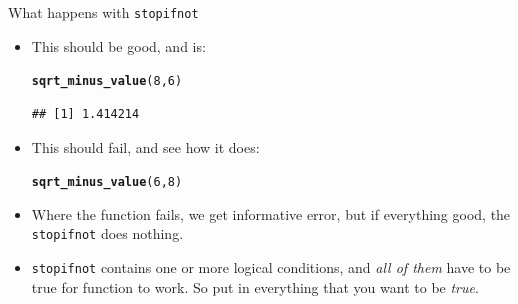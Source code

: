 \documentclass[unknownkeysallowed]{beamer}\usepackage[]{graphicx}\usepackage[]{color}
\makeatletter
\newcommand{\hlnum}[1]{\textcolor[rgb]{0.686,0.059,0.569}{#1}}%
\newcommand{\hlstd}[1]{\textcolor[rgb]{0.345,0.345,0.345}{#1}}%
\newcommand{\hlkwd}[1]{\textcolor[rgb]{0.737,0.353,0.396}{\textbf{#1}}}%
\newenvironment{kframe}{%
 \def\at@end@of@kframe{}%
 \ifinner\ifhmode%
  \def\at@end@of@kframe{\end{minipage}}%
  \begin{minipage}{\columnwidth}%
 \fi\fi%
 \def\FrameCommand##1{\hskip\@totalleftmargin \hskip-\fboxsep
 \colorbox{shadecolor}{##1}\hskip-\fboxsep
     \hskip-\linewidth \hskip-\@totalleftmargin \hskip\columnwidth}%
 \MakeFramed {\advance\hsize-\width
   \@totalleftmargin\z@ \linewidth\hsize
   \@setminipage}}%
 {\par\unskip\endMakeFramed%
 \at@end@of@kframe}
\newenvironment{knitrout}{}{} %
\makeatother
\begin{document}
\begin{frame}[fragile]{What happens with \texttt{stopifnot}}
  
  \begin{itemize}
  \item This should be good, and is:
    
\begin{knitrout}
\color{fgcolor}\begin{kframe}
\begin{alltt}
\hlkwd{sqrt_minus_value}\hlstd{(}\hlnum{8}\hlstd{,}\hlnum{6}\hlstd{)}
\end{alltt}
\begin{verbatim}
## [1] 1.414214
\end{verbatim}
\end{kframe}
\end{knitrout}

\item This should fail, and see how it does:
  
\begin{knitrout}
\color{fgcolor}\begin{kframe}
\begin{alltt}
\hlkwd{sqrt_minus_value}\hlstd{(}\hlnum{6}\hlstd{,}\hlnum{8}\hlstd{)}
\end{alltt}


{\ttfamily\noindent\bfseries\color{errorcolor}{\#\# Error: x - d >= 0 is not TRUE}}\end{kframe}
\end{knitrout}
\item Where the function fails, we get informative error, but if
  everything good, the \texttt{stopifnot} does nothing.
\item \texttt{stopifnot} contains one or more logical conditions, and
  \emph{all of them} have to be true for function to work. So put in
  everything that you want to be \emph{true}.
  \end{itemize}
  
\end{frame}
\end{document}
